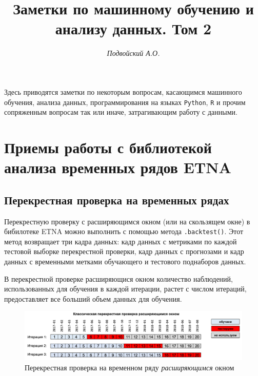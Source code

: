 \documentclass[%
	11pt,
	a4paper,
	utf8,
		]{article}
\begin{document}
\title{Заметки по машинному обучению и анализу данных. Том 2}

\author{\itshape Подвойский А.О.}

\date{}
\maketitle

\thispagestyle{fancy}

Здесь приводятся заметки по некоторым вопросам, касающимся машинного обучения, анализа данных, программирования на языках \texttt{Python}, \texttt{R} и прочим сопряженным вопросам так или иначе, затрагивающим работу с данными.



\tableofcontents

\section{Приемы работы с библиотекой анализа временных рядов ETNA}

\subsection{Перекрестная проверка на временных рядах}

Перекрестную проверку с расширяющимся окном (или на скользящем окне) в бибилотеке ETNA можно выполнить с помощью метода \verb|.backtest()|. Этот метод возвращает три кадра данных: кадр данных с метриками по каждой тестовой выборке перекрестной проверки, кадр данных с прогнозами и кадр данных с временными метками обучающего и тестового поднаборов данных.

В перекрестной проверке расширяющися окном количество наблюдений, использованных для обучения в каждой итерации, растет с числом итераций, предоставляет все больший объем данных для обучения.

\begin{figure}[h]
	\centering
	\includegraphics[scale=0.3]{figures/cross_val_ts.png}
	\caption{ Перекрестная проверка на временном ряду \emph{расширяющимся} окном }\label{fig:cross_val_ts}
\end{figure}
\end{document}
